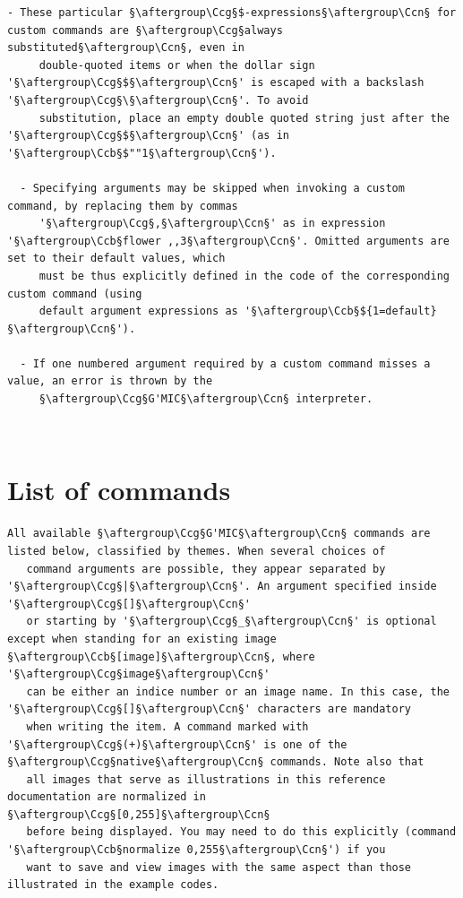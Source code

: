 \documentclass[a4paper,10.5pt,twoside]{book}
\def\Ccb{\color{cb}}
\def\Ccg{\color{cc}}
\def\Ccn{\color{black}}
\begin{document}
\begin{lstlisting}[escapechar=§]
  - These particular §\aftergroup\Ccg§$-expressions§\aftergroup\Ccn§ for custom commands are §\aftergroup\Ccg§always substituted§\aftergroup\Ccn§, even in 
     double-quoted items or when the dollar sign '§\aftergroup\Ccg§$§\aftergroup\Ccn§' is escaped with a backslash '§\aftergroup\Ccg§\§\aftergroup\Ccn§'. To avoid 
     substitution, place an empty double quoted string just after the '§\aftergroup\Ccg§$§\aftergroup\Ccn§' (as in '§\aftergroup\Ccb§$""1§\aftergroup\Ccn§'). 
 
  - Specifying arguments may be skipped when invoking a custom command, by replacing them by commas 
     '§\aftergroup\Ccg§,§\aftergroup\Ccn§' as in expression '§\aftergroup\Ccb§flower ,,3§\aftergroup\Ccn§'. Omitted arguments are set to their default values, which 
     must be thus explicitly defined in the code of the corresponding custom command (using 
     default argument expressions as '§\aftergroup\Ccb§${1=default}§\aftergroup\Ccn§'). 
 
  - If one numbered argument required by a custom command misses a value, an error is thrown by the 
     §\aftergroup\Ccg§G'MIC§\aftergroup\Ccn§ interpreter.
\end{lstlisting}
\normalsize
~\\\section{List of commands}
\small
\begin{lstlisting}[escapechar=§]
   All available §\aftergroup\Ccg§G'MIC§\aftergroup\Ccn§ commands are listed below, classified by themes. When several choices of 
   command arguments are possible, they appear separated by '§\aftergroup\Ccg§|§\aftergroup\Ccn§'. An argument specified inside '§\aftergroup\Ccg§[]§\aftergroup\Ccn§' 
   or starting by '§\aftergroup\Ccg§_§\aftergroup\Ccn§' is optional except when standing for an existing image §\aftergroup\Ccb§[image]§\aftergroup\Ccn§, where '§\aftergroup\Ccg§image§\aftergroup\Ccn§' 
   can be either an indice number or an image name. In this case, the '§\aftergroup\Ccg§[]§\aftergroup\Ccn§' characters are mandatory 
   when writing the item. A command marked with '§\aftergroup\Ccg§(+)§\aftergroup\Ccn§' is one of the §\aftergroup\Ccg§native§\aftergroup\Ccn§ commands. Note also that 
   all images that serve as illustrations in this reference documentation are normalized in §\aftergroup\Ccg§[0,255]§\aftergroup\Ccn§ 
   before being displayed. You may need to do this explicitly (command '§\aftergroup\Ccb§normalize 0,255§\aftergroup\Ccn§') if you 
   want to save and view images with the same aspect than those illustrated in the example codes.
\end{lstlisting}
\normalsize
\end{document}
